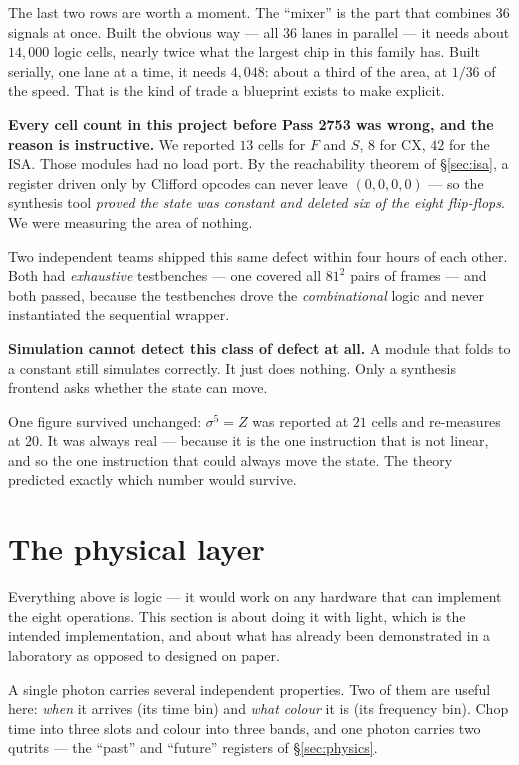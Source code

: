 \begin{plain}
The last two rows are worth a moment. The ``mixer'' is the part that combines $36$
signals at once. Built the obvious way --- all $36$ lanes in parallel --- it needs
about $14{,}000$ logic cells, nearly twice what the largest chip in this family has. Built
serially, one lane at a time, it needs $4{,}048$: about a third of the area, at
$1/36$ of the speed. That is the kind of trade a blueprint exists to make explicit.
\end{plain}

\begin{gotwrong}
\textbf{Every cell count in this project before Pass 2753 was wrong, and the reason is
instructive.} We reported $13$ cells for $F$ and $S$, $8$ for $\mathrm{CX}$, $42$ for the
ISA. Those modules had no load port. By the reachability theorem of \S\ref{sec:isa}, a
register driven only by Clifford opcodes can never leave $(0,0,0,0)$ --- so the synthesis
tool \emph{proved the state was constant and deleted six of the eight flip-flops}. We were
measuring the area of nothing.

\medskip\noindent
Two independent teams shipped this same defect within four hours of each other. Both had
\emph{exhaustive} testbenches --- one covered all $81^2$ pairs of frames --- and both
passed, because the testbenches drove the \emph{combinational} logic and never
instantiated the sequential wrapper.

\medskip\noindent
\textbf{Simulation cannot detect this class of defect at all.} A module that folds to a
constant still simulates correctly. It just does nothing. Only a synthesis frontend asks
whether the state can move.

\medskip\noindent
One figure survived unchanged: $\sigma^5=Z$ was reported at $21$ cells and re-measures at
$20$. It was always real --- because it is the one instruction that is not linear, and so
the one instruction that could always move the state. The theory predicted exactly which
number would survive.
\end{gotwrong}

\section{The physical layer}

\begin{plain}
Everything above is logic --- it would work on any hardware that can implement the eight
operations. This section is about doing it with light, which is the intended
implementation, and about what has already been demonstrated in a laboratory as opposed
to designed on paper.

A single photon carries several independent properties. Two of them are useful here:
\emph{when} it arrives (its time bin) and \emph{what colour} it is (its frequency bin).
Chop time into three slots and colour into three bands, and one photon carries two
qutrits --- the ``past'' and ``future'' registers of \S\ref{sec:physics}.
\end{plain}

